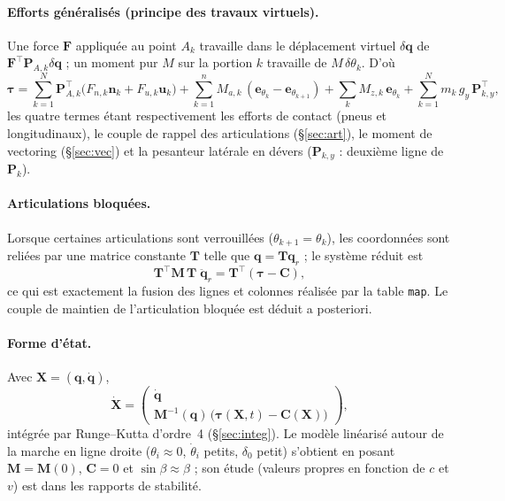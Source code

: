 \documentclass[11pt,a4paper]{article}
\newcommand{\vect}[1]{\bm{#1}}
\newcommand{\mat}[1]{\bm{#1}}
\newcommand{\T}{^{\!\top}}
\newcommand{\dt}[1]{\dot{#1}}
\newcommand{\ddt}[1]{\ddot{#1}}
\newcommand{\q}{\vect{q}}
\newcommand{\Mm}{\mat{M}}
\newcommand{\code}[1]{\texttt{#1}}
\begin{document}
\paragraph{Efforts généralisés (principe des travaux virtuels).} Une force $\vect F$ appliquée au point $A_k$ travaille dans le déplacement virtuel $\delta\q$ de $\vect F\T\mat P_{A,k}\delta\q$ ; un moment pur $M$ sur la portion $k$ travaille de $M\,\delta\theta_k$. D'où
\begin{equation}
 \vect\tau=\sum_{k=1}^{N}\mat P_{A,k}\T\big(F_{n,k}\vect n_k+F_{u,k}\vect u_k\big)
 +\sum_{k=1}^{n}M_{a,k}\,(\vect e_{\theta_k}-\vect e_{\theta_{k+1}})
 +\sum_{k}M_{z,k}\,\vect e_{\theta_k}
 +\sum_{k=1}^N m_k\,g_y\,\mat P_{k,y}\T,
\end{equation}
les quatre termes étant respectivement les efforts de contact (pneus et longitudinaux), le couple de rappel des articulations (§\ref{sec:art}), le moment de vectoring (§\ref{sec:vec}) et la pesanteur latérale en dévers ($\mat P_{k,y}$ : deuxième ligne de $\mat P_k$).

\paragraph{Articulations bloquées.} Lorsque certaines articulations sont verrouillées ($\theta_{k+1}=\theta_k$), les coordonnées sont reliées par une matrice constante $\mat T$ telle que $\q=\mat T\q_r$ ; le système réduit est
\begin{equation}
 \mat T\T\Mm\,\mat T\;\ddt\q_r=\mat T\T(\vect\tau-\vect C),
\end{equation}
ce qui est exactement la fusion des lignes et colonnes réalisée par la table \code{map}. Le couple de maintien de l'articulation bloquée est déduit a posteriori.

\paragraph{Forme d'état.} Avec $\vect X=(\q,\dt\q)$,
\begin{equation}
 \dt{\vect X}=\begin{pmatrix}\dt\q\\ \Mm^{-1}(\q)\,\big(\vect\tau(\vect X,t)-\vect C(\vect X)\big)\end{pmatrix},
\end{equation}
intégrée par Runge--Kutta d'ordre~4 (§\ref{sec:integ}). Le modèle linéarisé autour de la marche en ligne droite ($\theta_i\approx0$, $\dt\theta_i$ petits, $\delta_0$ petit) s'obtient en posant $\Mm=\Mm(0)$, $\vect C=0$ et $\sin\beta\approx\beta$ ; son étude (valeurs propres en fonction de $c$ et $v$) est dans les rapports de stabilité.
\end{document}
